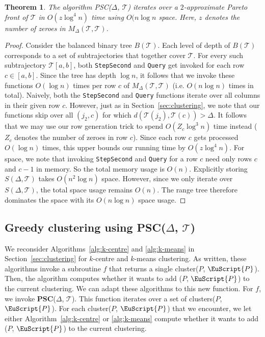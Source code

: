 \documentclass[11pt]{article}
\newcommand{\fancy}[1]{\EuScript{#1}}
\newcommand{\pathlet}{cluster\xspace}
\newcommand{\pathlets}{clusters\xspace}
\newtheorem{theorem}{Theorem}
\begin{document}
\begin{theorem}
The algorithm PSC($\Delta$, $\mathcal{T}$) iterates over a $2$-approximate Pareto front of $\mathcal{T}$ in $O(z \log^4 n)$ time using $O(n \log n$ space. Here, $z$ denotes the number of zeroes in $M_\Delta(\mathcal{T}, \mathcal{T})$. 
\end{theorem}

%
\begin{proof}
Consider the balanced binary tree $B(\mathcal{T})$.
Each level of depth of $B(\mathcal{T})$  corresponds to a set of subtrajectories that together cover $\mathcal{T}$. 
For every such subtrajectory $\mathcal{T}[a, b]$, both \texttt{StepSecond} and \texttt{Query} get invoked for each row $c \in [a, b]$. Since the tree has depth $\log n$, it follows that we invoke these functions $O(\log n)$ times per row $c$ of ${M}_\Delta(\mathcal{T}, \mathcal{T})$ (i.e. $O(n \log n)$ times in total). 
Naively, both the \texttt{StepSecond} and \texttt{Query} functions iterate over all columns in their given row $c$. 
However, just as in Section~\ref{sec:clustering}, we note that our functions skip over all $(j_2, c)$ for which $d(\mathcal{T}(j_2), \mathcal{T}(c)) > \Delta$. 
It follows that we may use our row generation trick to spend $O(Z_c \log^3 n)$ time instead ($Z_c$ denotes {the number of} zeroes in row $c$). 
Since each row $c$ gets processed $O(\log n)$ times, this upper bounds our running time by $O(z \log^4 n)$. 
%
For space, we note that invoking \texttt{StepSecond} and \texttt{Query} for a row $c$ need only rows $c$ and $c-1$ in memory. So the total memory usage is $O(n)$. 
Explicitly storing $S(\Delta, \mathcal{T})$ takes $O(n^2 \log n)$ space.
However, since we only iterate over $S(\Delta, \mathcal{T})$, the total space usage remains $O(n)$. 
The range tree therefore dominates the space with its $O(n \log n)$ space usage.
\end{proof}
%
%
\subsection{\texorpdfstring{Greedy clustering using \textbf{PSC($\Delta$, $\mathcal{T}$)}}{Greedy clustering using PSC(D, T)}}
%
We reconsider Algorithms~\ref{alg:k-centre} and \ref{alg:k-means} in Section~\ref{sec:clustering} for $k$-centre and $k$-means clustering. 
As written, these algorithms invoke a subroutine $f$ that returns a single \pathlet ($P$, ${\fancy{P}}$).
Then, the algorithm computes whether it wants to add ($P$, ${\fancy{P}}$) to the current clustering.
We can adapt these algorithms to this new function.
For $f$, we invoke \textbf{PSC}($\Delta$, $\mathcal{T}$). 
This function iterates over a set of \pathlets  ($P$, ${\fancy{P}}$).
For each \pathlet ($P$, ${\fancy{P}}$) that we encounter, we let either Algorithm~\ref{alg:k-centre} or \ref{alg:k-means} compute whether it wants to add ($P$, ${\fancy{P}}$) to the current clustering.
%
%
\end{document}
